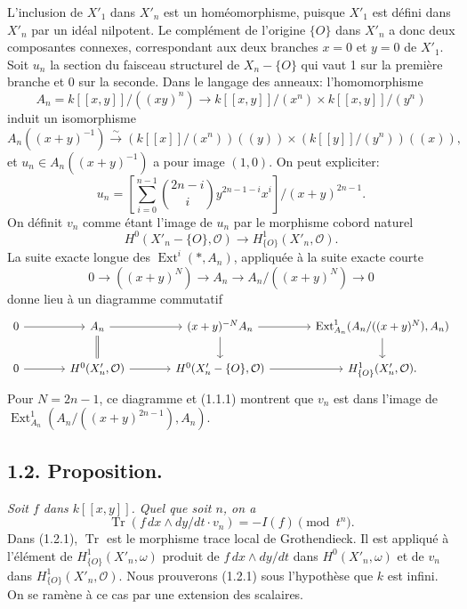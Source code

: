 \documentclass[11pt]{article}
\DeclareMathOperator{\Ext}{Ext}
\DeclareMathOperator{\Tr}{Tr}
\newcommand{\OO}{\mathcal O}
\begin{document}
L'inclusion de $X'_1$ dans $X'_n$ est un homéomorphisme, puisque $X'_1$ est défini dans $X'_n$ par un idéal nilpotent. Le complément de l'origine $\{O\}$ dans $X'_n$ a donc deux composantes connexes, correspondant aux deux branches $x=0$ et $y=0$ de $X'_1$. Soit $u_n$ la section du faisceau structurel de $X_n-\{O\}$ qui vaut 1 sur la première branche et 0 sur la seconde. Dans le langage des anneaux: l'homomorphisme
\[
        A_n=k[[x,y]]/((xy)^n)\longrightarrow k[[x,y]]/(x^n)\times k[[x,y]]/(y^n)
\]
induit un isomorphisme
\[
        A_n((x+y)^{-1})\xrightarrow{\sim}
        (k[[x]]/(x^n))((y))\times(k[[y]]/(y^n))((x)),
\]
et $u_n\in A_n((x+y)^{-1})$ a pour image $(1,0)$. On peut expliciter:
\begin{equation}
        u_n=\left[\sum_{i=0}^{n-1}\binom{2n-i}{i}y^{2n-1-i}x^i\right]\big/(x+y)^{2n-1}. \tag{1.1.1}
\end{equation}
On définit $v_n$ comme étant l'image de $u_n$ par le morphisme cobord naturel
\[
        H^0(X'_n-\{O\},\OO)\longrightarrow H^1_{\{O\}}(X'_n,\OO).
\]
La suite exacte longue des $\Ext^i(*,A_n)$, appliquée à la suite exacte courte
\[
        0\longrightarrow ((x+y)^N)\longrightarrow A_n\longrightarrow A_n/((x+y)^N)\longrightarrow0
\]
donne lieu à un diagramme commutatif
\[
\begin{tikzcd}[column sep=large]
0 \arrow[r] & A_n \arrow[r] \arrow[d,equal] & (x+y)^{-N}A_n \arrow[r] \arrow[d] & \Ext^1_{A_n}(A_n/((x+y)^N),A_n) \arrow[d] \\
0 \arrow[r] & H^0(X'_n,\OO) \arrow[r] & H^0(X'_n-\{O\},\OO) \arrow[r] & H^1_{\{O\}}(X'_n,\OO).
\end{tikzcd}
\]
Pour $N=2n-1$, ce diagramme et (1.1.1) montrent que $v_n$ est dans l'image de $\Ext^1_{A_n}(A_n/((x+y)^{2n-1}),A_n)$.

\subsection*{1.2. Proposition.}
\emph{Soit $f$ dans $k[[x,y]]$. Quel que soit $n$, on a}
\begin{equation}
        \Tr(f\,dx\wedge dy/dt\cdot v_n)=-I(f)\pmod {t^n}. \tag{1.2.1}
\end{equation}
Dans (1.2.1), $\Tr$ est le morphisme trace local de Grothendieck. Il est appliqué à l'élément de $H^1_{\{O\}}(X'_n,\omega)$ produit de $f\,dx\wedge dy/dt$ dans $H^0(X'_n,\omega)$ et de $v_n$ dans $H^1_{\{O\}}(X'_n,\OO)$. Nous prouverons (1.2.1) sous l'hypothèse que $k$ est infini. On se ramène à ce cas par une extension des scalaires.
\end{document}
